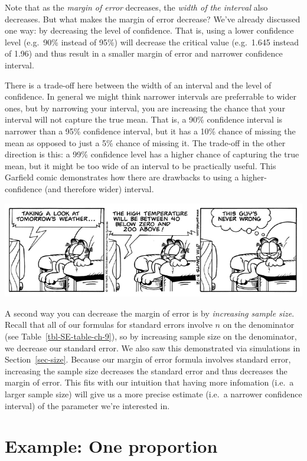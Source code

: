 \documentclass[
  letterpaper,
  DIV=11,
  numbers=noendperiod]{scrreprt}
\theoremstyle{definition}
\theoremstyle{remark}
\begin{document}
Note that as the \emph{margin of error} decreases, the \emph{width of
the interval} also decreases. But what makes the margin of error
decrease? We've already discussed one way: by decreasing the level of
confidence. That is, using a lower confidence level (e.g.~90\% instead
of 95\%) will decrease the critical value (e.g.~1.645 instead of 1.96)
and thus result in a smaller margin of error and narrower confidence
interval.

There is a trade-off here between the width of an interval and the level
of confidence. In general we might think narrower intervals are
preferrable to wider ones, but by narrowing your interval, you are
increasing the chance that your interval will not capture the true mean.
That is, a 90\% confidence interval is narrower than a 95\% confidence
interval, but it has a 10\% chance of missing the mean as opposed to
just a 5\% chance of missing it. The trade-off in the other direction is
this: a 99\% confidence level has a higher chance of capturing the true
mean, but it might be too wide of an interval to be practically useful.
This Garfield comic demonstrates how there are drawbacks to using a
higher-confidence (and therefore wider) interval.

\includegraphics{images/garfield_comic.png}

A second way you can decrease the margin of error is by \emph{increasing
sample size}. Recall that all of our formulas for standard errors
involve \(n\) on the denominator (see Table~\ref{tbl-SE-table-ch-9}), so
by increasing sample size on the denominator, we decrease our standard
error. We also saw this demonstrated via simulations in
Section~\ref{sec-size}. Because our margin of error formula involves
standard error, increasing the sample size decreases the standard error
and thus decreases the margin of error. This fits with our intuition
that having more infomation (i.e.~a larger sample size) will give us a
more precise estimate (i.e.~a narrower confidence interval) of the
parameter we're interested in.

\hypertarget{sec-one-prop-ci}{%
\section{Example: One proportion}\label{sec-one-prop-ci}}
\end{document}
